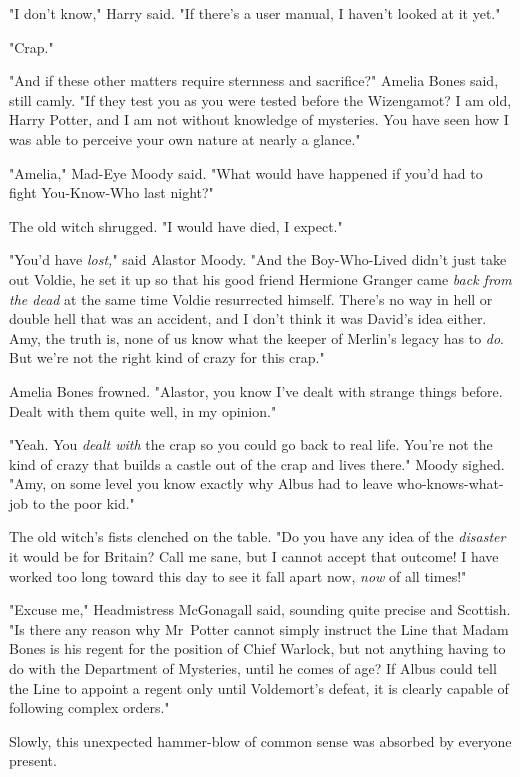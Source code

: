 "I don't know," Harry said. "If there's a user manual, I haven't looked at it
yet."

"Crap."

"And if these other matters require sternness and sacrifice?" Amelia Bones
said, still camly. "If they test you as you were tested before the Wizengamot?
I am old, Harry Potter, and I am not without knowledge of mysteries. You have
seen how I was able to perceive your own nature at nearly a glance."

"Amelia," Mad-Eye Moody said. "What would have happened if you'd had to fight
You-Know-Who last night?"

The old witch shrugged. "I would have died, I expect."

"You'd have \emph{lost,}" said Alastor Moody. "And the Boy-Who-Lived didn't
just take out Voldie, he set it up so that his good friend Hermione Granger
came \emph{back from the dead} at the same time Voldie resurrected himself.
There's no way in hell or double hell that was an accident, and I don't think
it was David's idea either. Amy, the truth is, none of us know what the keeper
of Merlin's legacy has to \emph{do}. But we're not the right kind of crazy for
this crap."

Amelia Bones frowned. "Alastor, you know I've dealt with strange things before.
Dealt with them quite well, in my opinion."

"Yeah. You \emph{dealt with} the crap so you could go back to real life. You're
not the kind of crazy that builds a castle out of the crap and lives there."
Moody sighed. "Amy, on some level you know exactly why Albus had to leave
who-knows-what-job to the poor kid."

The old witch's fists clenched on the table. "Do you have any idea of the
\emph{disaster} it would be for Britain? Call me sane, but I cannot accept that
outcome! I have worked too long toward this day to see it fall apart now,
\emph{now} of all times!"

"Excuse me," Headmistress McGonagall said, sounding quite precise and Scottish.
"Is there any reason why Mr~Potter cannot simply instruct the Line that Madam
Bones is his regent for the position of Chief Warlock, but not anything having
to do with the Department of Mysteries, until he comes of age? If Albus could
tell the Line to appoint a regent only until Voldemort's defeat, it is clearly
capable of following complex orders."

Slowly, this unexpected hammer-blow of common sense was absorbed by everyone
present.


